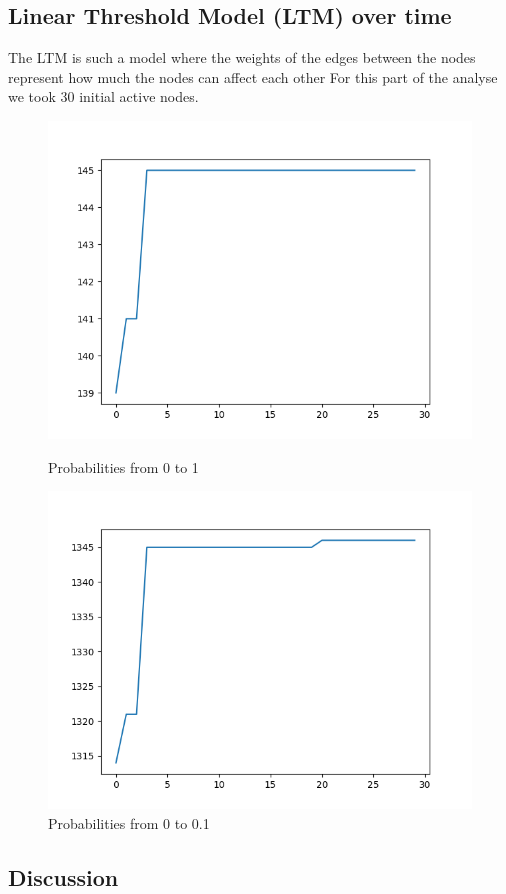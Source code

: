 \subsection{Linear Threshold Model (LTM) over time}
The LTM is such a model where the weights of the edges between the nodes represent how much the nodes can affect each other
For this part of the analyse we took 30 initial active nodes.
\begin{figure}[H]
    \includegraphics[width=\linewidth]{Report/images/sumLTM-0to1.png}
    \caption{Probabilities from 0 to 1}\label{fig:awesome_image1}
\endminipage\hfill
{}
    \includegraphics[width=\linewidth]{Report/images/sumLTM.png}
    \caption{Probabilities from 0 to 0.1}\label{fig:awesome_image2}
\endminipage
\end{figure}
\subsection{Discussion}

